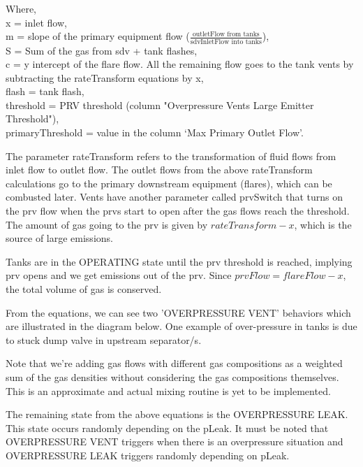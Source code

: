 Where, \\
x = inlet flow, \\
m = slope of the primary equipment flow ($\frac{\text{outletFlow from tanks}}{\text{sdvInletFlow into tanks}}$),\\
S = Sum of the gas from sdv + tank flashes, \\
c = y intercept of the flare flow. All the remaining flow goes to the tank vents by subtracting the rateTransform equations by x, \\
flash = tank flash, \\
threshold = PRV threshold (column "Overpressure Vents Large Emitter Threshold"),\\
primaryThreshold = value in the column `Max Primary Outlet Flow'. 
\par The parameter rateTransform refers to the transformation of fluid flows from inlet flow to outlet flow. The outlet flows from the above rateTransform calculations go to the primary downstream equipment (flares), which can be combusted later. Vents have another parameter called prvSwitch that turns on the prv flow when the prvs start to open after the gas flows reach the threshold. The amount of gas going to the prv is given by $rateTransform - x$, which is the source of large emissions.
\par Tanks are in the OPERATING state until the prv threshold is reached, implying prv opens and we get emissions out of the prv. Since $prvFlow=flareFlow-x$, the total volume of gas is conserved.
\par From the equations, we can see two 'OVERPRESSURE VENT' behaviors which are illustrated in the diagram below. One example of over-pressure in tanks is due to stuck dump valve in upstream separator/s.

\par Note that we’re adding gas flows with different gas compositions as a weighted sum of the gas densities without considering the gas compositions themselves. This is an approximate and actual mixing routine is yet to be implemented. 
\par The remaining state from the above equations is the OVERPRESSURE LEAK. This state occurs randomly depending on the pLeak. It must be noted that OVERPRESSURE VENT triggers when there is an overpressure situation and OVERPRESSURE LEAK triggers randomly depending on pLeak. 



